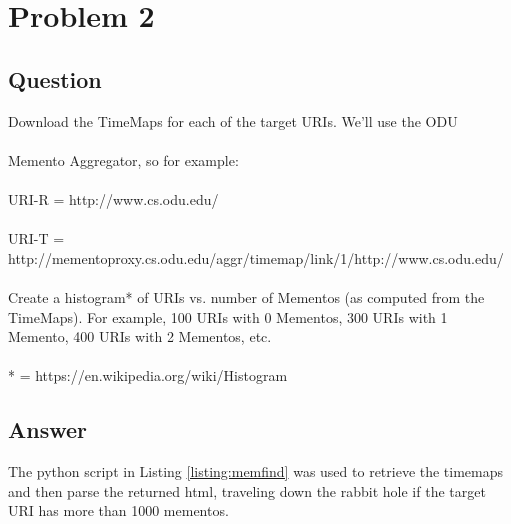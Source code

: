 \section{Problem 2}

\subsection{Question}
\vspace*{10pt}
Download the TimeMaps for each of the target URIs.  We'll use the ODU\\
\\
Memento Aggregator, so for example:\\
\\
URI-R = http://www.cs.odu.edu/\\
\\
URI-T = http://mementoproxy.cs.odu.edu/aggr/timemap/link/1/http://www.cs.odu.edu/\\
\\
Create a histogram* of URIs vs. number of Mementos (as computed from
the TimeMaps).  For example, 100 URIs with 0 Mementos, 300 URIs
with 1 Memento, 400 URIs with 2 Mementos, etc.\\
\\
* = https://en.wikipedia.org/wiki/Histogram
\subsection{Answer}
The python script in Listing \ref{listing:memfind} was used to retrieve the timemaps and then parse the returned html, traveling down the rabbit hole if the target URI has more than 1000 mementos.
\vspace{1mm}


